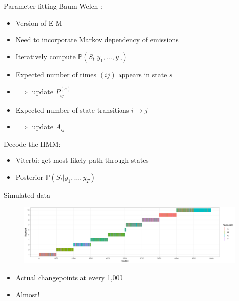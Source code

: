 \documentclass{beamer}
\begin{document}
\begin{frame}{Parameter fitting}
Baum-Welch \citep{durbin}:
\begin{itemize}
\item Version of E-M
\item Need to incorporate Markov dependency of emissions
\item Iteratively compute $\mathbb{P}(S_t | y_1, \hdots, y_T)$
\item Expected number of times $(i j)$ appears in state $s$ 
\item[ ] $\implies$ update $P_{ij}^{(s)}$
\item Expected number of state transitions $i \rightarrow j$
\item[ ] $\implies$ update $A_{ij}$
\end{itemize}
\vspace{20pt}
Decode the HMM:
\begin{itemize}
\item Viterbi: get most likely path through states
\item Posterior $\mathbb{P}(S_t | y_1, \hdots, y_T)$
\end{itemize}
\end{frame}


\begin{frame}{Simulated data}
\begin{figure}
\includegraphics[width=\textwidth]{fig2.pdf}
\end{figure}
\begin{itemize}
\item Actual changepoints at every 1,000
\item Almost!
\end{itemize}
\end{frame}
\end{document}
